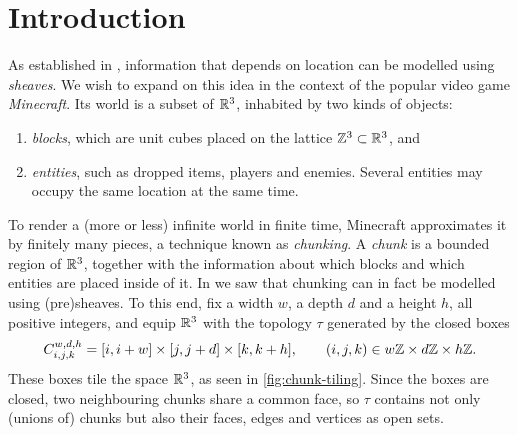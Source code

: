 \section{Introduction}\label{sec:introduction}

As established in \cite{happelSheavesMinecraft2021}, information that depends
on location can be modelled using \emph{sheaves}. We wish to expand on this idea
in the context of the popular video game \emph{Minecraft}. Its world is a subset
of $\mathbb{R}^3$, inhabited by two kinds of objects:
\begin{enumerate}[label=(\arabic*)]
	\item \emph{blocks}, which are unit cubes placed on the lattice
	      $\mathbb{Z}^3 \subset \mathbb{R}^3$, and
	\item \emph{entities}, such as dropped items, players and enemies. Several
	      entities may occupy the same location at the same time.
\end{enumerate}

To render a (more or less) infinite world in finite time, Minecraft
approximates it by finitely many pieces, a technique known as
\emph{chunking}. A \emph{chunk} is a bounded region of $\mathbb{R}^3$, together with
the information about which blocks and which entities are placed inside of it.
In \cite{happelSheavesMinecraft2021} we saw that chunking can in fact be
modelled using (pre)sheaves. To this end, fix a width $w$, a depth $d$ and a
height $h$, all positive integers, and equip $\mathbb{R}^3$ with the topology $\tau$
generated by the closed boxes
\[
	C_{i,j,k}^{w,d,h} = [i, i+w] \times [j, j+d] \times [k, k+h],
	\qquad (i,j,k) \in w\mathbb{Z} \times d\mathbb{Z} \times h\mathbb{Z}.
\]
These boxes tile the space $\mathbb{R}^3$, as seen in \cref{fig:chunk-tiling}. Since
the boxes are closed, two neighbouring chunks share a common face, so $\tau$
contains not only (unions of) chunks but also their faces, edges and vertices
as open sets.

